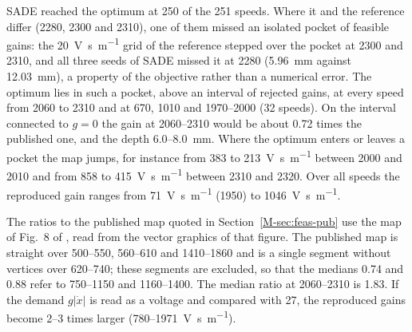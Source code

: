 SADE reached the optimum at 250 of the 251 speeds. Where it and the reference differ (2280, 2300 and \SI{2310}{\rpm}), one of them missed an isolated pocket of feasible gains: the \SI{20}{\volt\second\per\metre} grid of the reference stepped over the pocket at 2300 and \SI{2310}{\rpm}, and all three seeds of SADE missed it at \SI{2280}{\rpm} (\SI{5.96}{\milli\metre} against \SI{12.03}{\milli\metre}), a property of the objective rather than a numerical error. The optimum lies in such a pocket, above an interval of rejected gains, at every speed from 2060 to \SI{2310}{\rpm} and at 670, 1010 and 1970--\SI{2000}{\rpm} (32 speeds). On the interval connected to $g=0$ the gain at 2060--\SI{2310}{\rpm} would be about 0.72 times the published one, and the depth 6.0--\SI{8.0}{\milli\metre}. Where the optimum enters or leaves a pocket the map jumps, for instance from 383 to \SI{213}{\volt\second\per\metre} between 2000 and \SI{2010}{\rpm} and from 858 to \SI{415}{\volt\second\per\metre} between 2310 and \SI{2320}{\rpm}. Over all speeds the reproduced gain ranges from \SI{71}{\volt\second\per\metre} (\SI{1950}{\rpm}) to \SI{1046}{\volt\second\per\metre}.

The ratios to the published map quoted in Section~\ref{M-sec:feas-pub} use the map of Fig.~8 of \citet{ozsoy2026robust}, read from the vector graphics of that figure. The published map is straight over 500--550, 560--610 and 1410--\SI{1860}{\rpm} and is a single segment without vertices over 620--\SI{740}{\rpm}; these segments are excluded, so that the medians 0.74 and 0.88 refer to 750--1150 and 1160--\SI{1400}{\rpm}. The median ratio at 2060--\SI{2310}{\rpm} is 1.83. If the demand $g\lvert\dot x\rvert$ is read as a voltage and compared with 27, the reproduced gains become 2--3 times larger (780--\SI{1971}{\volt\second\per\metre}).

